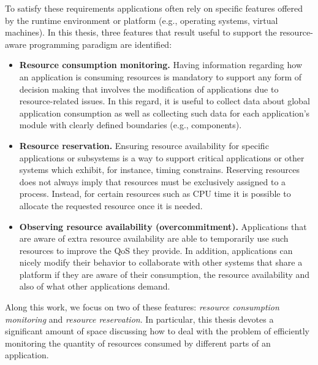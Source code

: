 To satisfy these requirements applications often rely on specific features offered by the runtime environment or platform (e.g., operating systems, virtual machines).
In this thesis, three features that result useful to support the resource-aware programming paradigm are identified:

\begin{itemize}
\item \textbf{Resource consumption monitoring.}
Having information regarding how an application is consuming resources is mandatory to support any form of decision making that involves the modification of applications due to resource-related issues. 
In this regard, it is useful to collect data about global application consumption as well as collecting such data for each application's module with clearly defined boundaries (e.g., components).

\item \textbf{Resource reservation.}
Ensuring resource availability for specific applications or subsystems is a way to support critical applications or other systems which exhibit, for instance, timing constrains.
Reserving resources does not always imply that resources must be exclusively assigned to a process.
Instead, for certain resources such as CPU time it is possible to allocate the requested resource once it is needed.

\item \textbf{Observing resource availability (overcommitment).} 
Applications that are aware of extra resource availability are able to temporarily use such resources to improve the QoS they provide.
In addition, applications can nicely modify their behavior to collaborate with other systems that share a platform if they are aware of their consumption, the resource availability and also of what other applications demand.
\end{itemize}

Along this work, we focus on two of these features: \textit{resource consumption monitoring} and \textit{resource reservation}.
In particular, this thesis devotes a significant amount of space discussing how to deal with the problem of efficiently monitoring the quantity of resources consumed by different parts of an application.


